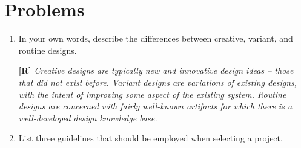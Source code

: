 \section{Problems}
\label{section:problems}


\begin{enumerate}
\def\labelenumi{\arabic{enumi}.}
\item
  In your own words, describe the differences between creative, variant,
  and routine designs.
 \begin{onlysolution}
 \textbf{[R]}
 \itshape
 Creative designs are typically new and innovative design ideas -- those
that did not exist before. Variant designs are variations of existing
designs, with the intent of improving some aspect of the existing
system. Routine designs are concerned with fairly well-known artifacts
for which there is a well-developed design knowledge base.
  \end{onlysolution}
  
\item
  List three guidelines that should be employed when selecting a
  project.
\end{enumerate}
